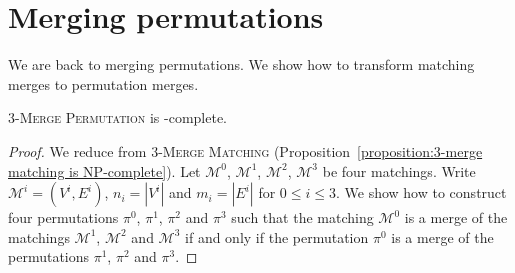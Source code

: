 \section{Merging permutations}
\label{section:Merging permutations}

We are back to merging permutations. 
We show how to transform matching merges to permutation merges.

\begin{proposition}
  \label{proposition:3-merge permutation is NP-complete}
  \textsc{$3$-Merge Permutation} is \NP-complete.
\end{proposition}

\begin{proof}
  We reduce from \textsc{$3$-Merge Matching} (Proposition~\ref{proposition:3-merge matching is NP-complete}).
  Let $\mathcal{M}^{0}$, $\mathcal{M}^{1}$, $\mathcal{M}^{2}$, $\mathcal{M}^{3}$ be four matchings. 
  Write $\mathcal{M}^{i} = (V^i, E^i)$,
  $n_i = |V^i|$ and $m_i = |E^i|$ for $0 \leq i \leq 3$.
  We show how to construct four permutations $\pi^0$, $\pi^1$, $\pi^2$ and $\pi^3$ such that
  the matching $\mathcal{M}^{0}$ is a merge of the matchings $\mathcal{M}^{1}$, $\mathcal{M}^{2}$ and $\mathcal{M}^{3}$
  if and only if
  the permutation $\pi^0$ is a merge of the permutations $\pi^1$, $\pi^2$ and $\pi^3$.


\end{proof}
